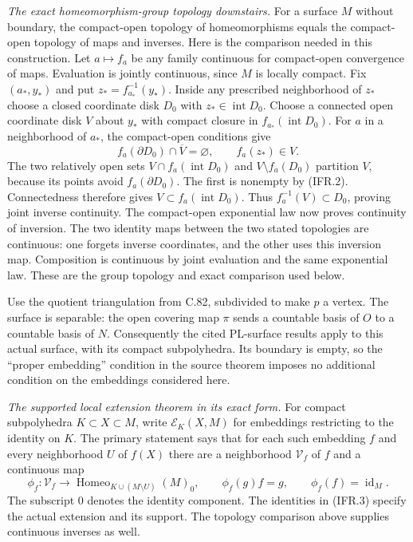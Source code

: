 \documentclass[11pt,a4paper]{article}
\DeclareMathOperator{\id}{id}\DeclareMathOperator{\im}{im}
\begin{document}
\emph{The exact homeomorphism-group topology downstairs.}
For a surface $M$ without boundary, the compact-open topology of
homeomorphisms equals the compact-open topology of maps and inverses.
Here is the comparison needed in this construction. Let $a\mapsto f_a$
be any family continuous for compact-open convergence of maps.
Evaluation is jointly continuous, since $M$ is locally compact.
Fix $(a_*,y_*)$ and put $z_*=f_{a_*}^{-1}(y_*)$.
Inside any prescribed neighborhood of $z_*$ choose a closed coordinate
disk $D_0$ with $z_*\in\operatorname{int}D_0$.
Choose a connected open coordinate disk $V$ about $y_*$ with compact
closure in $f_{a_*}(\operatorname{int}D_0)$.
For $a$ in a neighborhood of $a_*$, the compact-open conditions give
\[
 f_a(\partial D_0)\cap\overline V=\varnothing,
                  \qquad f_a(z_*)\in V.                         \tag{IFR.2}
\]
The two relatively open sets
$V\cap f_a(\operatorname{int}D_0)$ and $V\setminus f_a(D_0)$
partition $V$, because its points avoid $f_a(\partial D_0)$.
The first is nonempty by (IFR.2). Connectedness therefore gives
$V\subset f_a(\operatorname{int}D_0)$.
Thus $f_a^{-1}(V)\subset D_0$, proving joint inverse continuity.
The compact-open exponential law now proves continuity of inversion.
The two identity maps between the two stated topologies are continuous:
one forgets inverse coordinates, and the other uses this inversion map.
Composition is continuous by joint evaluation and the same exponential
law. These are the group topology and exact comparison used below.

Use the quotient triangulation from C.82, subdivided to make $p$
a vertex. The surface is separable: the open covering map $\pi$
sends a countable basis of $O$ to a countable basis of $N$.
Consequently the cited PL-surface results apply to this actual
surface, with its compact subpolyhedra. Its boundary is empty,
so the ``proper embedding'' condition in the source theorem imposes
no additional condition on the embeddings considered here.

\emph{The supported local extension theorem in its exact form.}
For compact subpolyhedra $K\subset X\subset M$, write
$\mathcal E_K(X,M)$ for embeddings restricting to the identity on $K$.
The primary statement
\cite[Theorem~2.1, p.~2]{C_Yagasaki2000} says that for each such
embedding $f$ and every neighborhood $U$ of $f(X)$ there are a
neighborhood $\mathcal V_f$ of $f$ and a continuous map
\[
 \phi_f:\mathcal V_f\longrightarrow
 \operatorname{Homeo}_{K\cup(M\setminus U)}(M)_0,
 \qquad \phi_f(g)f=g,\qquad \phi_f(f)=\id_M.                    \tag{IFR.3}
\]
The subscript $0$ denotes the identity component. The identities
in (IFR.3) specify the actual extension and its support. The topology
comparison above supplies continuous inverses as well.
\end{document}
